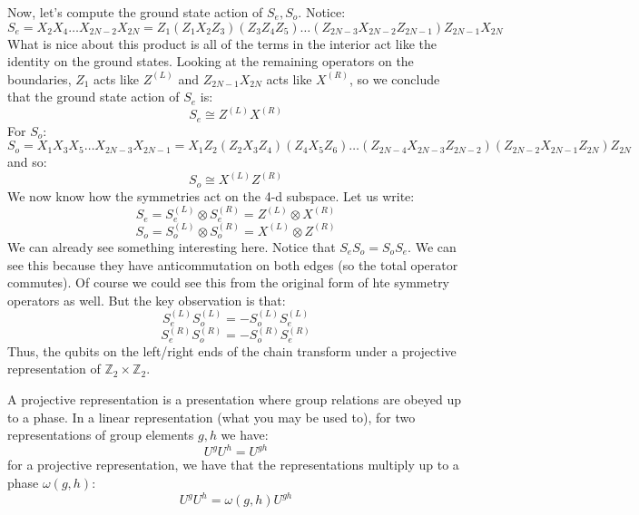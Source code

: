 Now, let's compute the ground state action of $S_e, S_o$. Notice:
\begin{equation}
    S_e = X_2X_4\ldots X_{2N-2}X_{2N} = Z_1(Z_1X_2Z_3)(Z_3Z_4Z_5)\ldots (Z_{2N-3}X_{2N-2}Z_{2N-1})Z_{2N-1}X_{2N}
\end{equation}
What is nice about this product is all of the terms in the interior act like the identity on the ground states. Looking at the remaining operators on the boundaries, $Z_1$ acts like $Z^{(L)}$ and $Z_{2N-1}X_{2N}$ acts like $X^{(R)}$, so we conclude that the ground state action of $S_e$ is:
\begin{equation}
    S_e \cong Z^{(L)}X^{(R)}
\end{equation}
For $S_o$:
\begin{equation}
    S_o = X_1X_3X_5\ldots X_{2N-3}X_{2N-1} = X_1Z_2(Z_2X_3Z_4)(Z_4X_5Z_6)\ldots (Z_{2N-4}X_{2N-3}Z_{2N-2})(Z_{2N-2}X_{2N-1}Z_{2N})Z_{2N}
\end{equation}
and so:
\begin{equation}
    S_o \cong X^{(L)}Z^{(R)}
\end{equation}
We now know how the symmetries act on the 4-d subspace. Let us write:
\begin{equation}
    S_e = S_e^{(L)} \otimes S_e^{(R)} = Z^{(L)}\otimes X^{(R)}
\end{equation}
\begin{equation}
    S_o = S_o^{(L)} \otimes S_o^{(R)} = X^{(L)}\otimes Z^{(R)}
\end{equation}
We can already see something interesting here. Notice that $S_eS_o = S_oS_e$. We can see this because they have anticommutation on both edges (so the total operator commutes). Of course we could see this from the original form of hte symmetry operators as well. But the key observation is that:
\begin{equation}
    S_e^{(L)}S_o^{(L)} = -S_o^{(L)}S_e^{(L)}
\end{equation}
\begin{equation}
    S_e^{(R)}S_o^{(R)} = -S_o^{(R)}S_e^{(R)}
\end{equation}
Thus, the qubits on the left/right ends of the chain transform under a projective representation of $\mathbb{Z}_2 \times \mathbb{Z}_2$.

A projective representation is a presentation where group relations are obeyed up to a phase. In a linear representation (what you may be used to), for two representations of group elements $g, h$ we have:
\begin{equation}
    U^g U^h = U^{gh}
\end{equation}
for a projective representation, we have that the representations multiply up to a phase $\omega(g, h)$:
\begin{equation}
    U^g U^h = \omega(g, h)U^{gh}
\end{equation}

